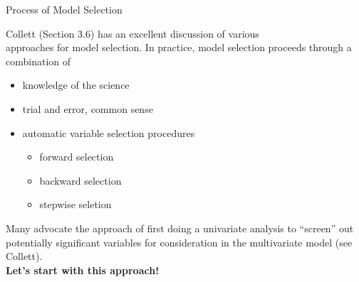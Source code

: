 \documentclass[envcountsect, 10pt, portrait, palatino]{beamer}
\begin{document}
\begin{frame}{Process of Model Selection}

Collett (Section 3.6) has an excellent discussion of various
\\approaches for model selection.  In practice, model selection
proceeds through a combination of

\begin{itemize}
\item  knowledge of the science

\item  trial and error, common sense

\item  automatic variable selection procedures
\begin{itemize}
\item forward selection
\item backward selection
\item stepwise seletion
\end{itemize}
\end{itemize}

Many advocate the approach of first doing a univariate
analysis to ``screen'' out potentially significant variables
for consideration in the multivariate model (see Collett).
\\[2ex]
{\bf Let's start with this approach!}
\end{frame}
\end{document}
